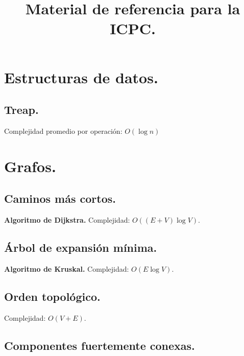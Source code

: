 \documentclass[10pt, letterpaper, twoside]{article}
\title{Material de referencia para la ICPC.}
\author{}
\date{}
\begin{document}
\maketitle

\tableofcontents

\newpage

\section{Estructuras de datos.}

\subsection{Treap.}

Complejidad promedio por operación: $O(\log n)$

 \medskip


\section{Grafos.}

\subsection{Caminos más cortos.}

\textbf{Algoritmo de Dijkstra.} Complejidad: $O((E + V) \log V)$.



\subsection{Árbol de expansión mínima.}

\textbf{Algoritmo de Kruskal.} Complejidad: $O(E \log V)$.



\subsection{Orden topológico.}

Complejidad: $O(V + E)$.



\subsection{Componentes fuertemente conexas.}
\end{document}
